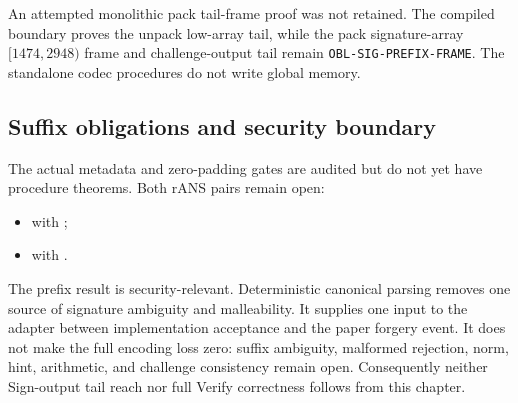 An attempted monolithic pack tail-frame proof was not retained. The compiled
boundary proves the unpack low-array tail, while the pack signature-array
$[1474,2948)$ frame and challenge-output tail remain
\texttt{OBL-SIG-PREFIX-FRAME}. The standalone codec procedures do not write
global memory.

\subsection*{Suffix obligations and security boundary}

The actual metadata and zero-padding gates are audited but do not yet have
procedure theorems. Both rANS pairs remain open:
\begin{itemize}
\item {} with ;
\item {} with .
\end{itemize}

The prefix result is security-relevant. Deterministic canonical parsing
removes one source of signature ambiguity and malleability. It supplies one
input to the adapter between implementation acceptance and the paper forgery
event. It does not make the full encoding loss zero: suffix ambiguity,
malformed rejection, norm, hint, arithmetic, and challenge consistency remain
open. Consequently neither Sign-output tail reach nor full Verify correctness
follows from this chapter.

